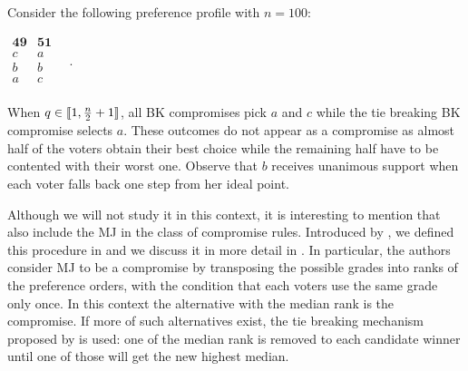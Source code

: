 \begin{example}
	\label{ex:CompromiseGEQ3}
	Consider the following preference profile with $n=100$:
	\begin{center}
		$
		\begin{array}{cc}
			\mathbf{49} & \mathbf{51} \\
			c	&	a	\\
			b	&	b	\\
			a	&	c	\\
		\end{array} \quad.
		$
	\end{center}
	When $q\in \llbracket1,\frac{n}{2}+1\rrbracket $, all BK compromises pick $a$ and $c$ while the tie breaking BK compromise selects $a$. These outcomes do not appear as a compromise as almost half of the voters obtain their best choice while the remaining half have to be contented with their worst one. Observe that $b$ receives unanimous support when each voter falls back one step from her ideal point.
\end{example}

Although we will not study it in this context, it is interesting to mention that \citet{Merlin2019} also include the \acl{MJ} in the class of compromise rules. Introduced by \citet{Balinski2007,Balinski2011}, we defined this procedure in  and we discuss it in more detail in . In particular, the authors consider \acs{MJ} to be a compromise by transposing the possible grades into ranks of the preference orders, with the condition that each voters use the same grade only once. In this context the alternative with the median rank is the compromise. If more of such alternatives exist, the tie breaking mechanism proposed by \citet{Balinski2011} is used: one of the median rank is removed to each candidate winner until one of those will get the new highest median.

